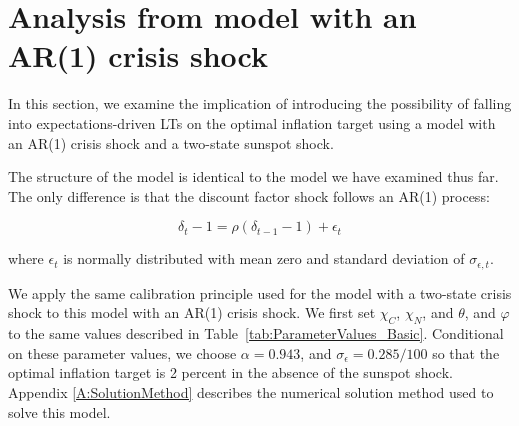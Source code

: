 \documentclass[11pt]{article}
\begin{document}
	\section{Analysis from model with an AR(1) crisis shock}
	\label{S:AR1Model}

    In this section, we examine the implication of introducing the possibility of falling into expectations-driven LTs on the optimal inflation target using a model with an AR(1) crisis shock and a two-state sunspot shock. 
    
    The structure of the model is identical to the model we have examined thus far. The only difference is that the discount factor shock follows an AR(1) process:
    
    \begin{equation}
	\delta_{t}-1 = \rho (\delta_{t-1}-1)+\epsilon_{t}
    \end{equation}

    \noindent where $\epsilon_{t}$ is normally distributed with mean zero and standard deviation of $\sigma_{\epsilon,t}$. 

    We apply the same calibration principle used for the model with a two-state crisis shock to this model with an AR(1) crisis shock. We first set $\chi_{C}$, $\chi_{N}$, and $\theta$, and $\varphi$ to the same values described in Table~\ref{tab:ParameterValues_Basic}. Conditional on these parameter values, we choose $\alpha = 0.943$, and $\sigma_{\epsilon} = 0.285/100$ so that the optimal inflation target is 2 percent in the absence of the sunspot shock. Appendix \ref{A:SolutionMethod} describes the numerical solution method used to solve this model.
    
\end{document}
